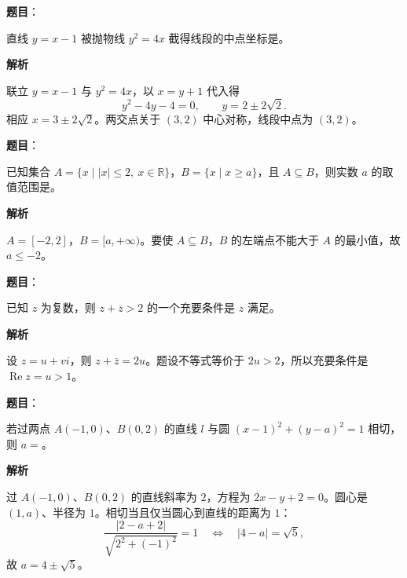 \begin{answer}

\textbf{题目}：

直线 $y=x-1$ 被抛物线 $y^2=4x$ 截得线段的中点坐标是\underline{\qquad}。

\textbf{解析}

联立 $y=x-1$ 与 $y^2=4x$，以 $x=y+1$ 代入得
\nopagebreak[4]
\[
y^2-4y-4=0,\qquad y=2\pm2\sqrt2.
\]
相应 $x=3\pm2\sqrt2$。两交点关于 $(3,2)$ 中心对称，线段中点为 $(3,2)$。


\end{answer}
\begin{answer}

\textbf{题目}：

已知集合 $A=\{x\mid |x|\leqslant 2,\ x\in\mathbb R\}$，$B=\{x\mid x\geqslant a\}$，且 $A\subseteq B$，则实数 $a$ 的取值范围是\underline{\qquad}。

\textbf{解析}

$A=[-2,2]$，$B=[a,+\infty)$。要使 $A\subseteq B$，$B$ 的左端点不能大于 $A$ 的最小值，故 $a\le-2$。


\end{answer}
\begin{answer}

\textbf{题目}：

已知 $z$ 为复数，则 $z+\overline z>2$ 的一个充要条件是 $z$ 满足\underline{\qquad}。

\textbf{解析}

设 $z=u+vi$，则 $z+\overline z=2u$。题设不等式等价于 $2u>2$，所以充要条件是 $\operatorname{Re}z=u>1$。


\end{answer}
\begin{answer}

\textbf{题目}：

若过两点 $A(-1,0)$、$B(0,2)$ 的直线 $l$ 与圆 $(x-1)^2+(y-a)^2=1$ 相切，则 $a=$\underline{\qquad}。

\textbf{解析}

过 $A(-1,0)$、$B(0,2)$ 的直线斜率为 $2$，方程为 $2x-y+2=0$。圆心是 $(1,a)$、半径为 $1$。相切当且仅当圆心到直线的距离为 $1$：
\nopagebreak[4]
\[
\frac{|2-a+2|}{\sqrt{2^2+(-1)^2}}=1
\quad\Longleftrightarrow\quad |4-a|=\sqrt5,
\]
故 $a=4\pm\sqrt5$。


\end{answer}
